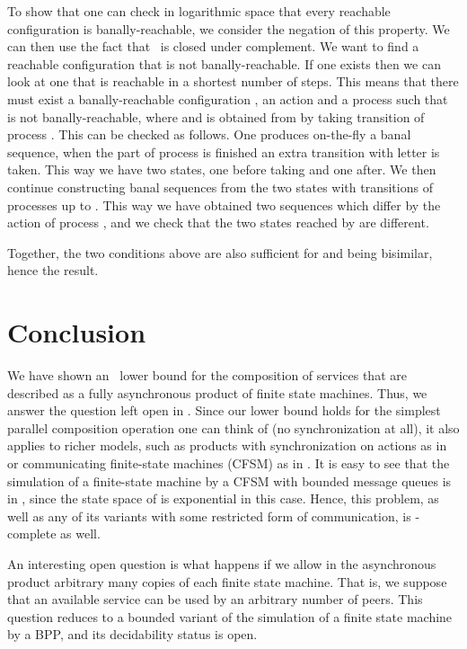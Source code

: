 \documentclass{LMCS}
\theoremstyle{plain}\newtheorem{remark}{Remark}
\theoremstyle{plain}\newtheorem{lemma}[thm]{Lemma}
\begin{document}
To show that one can check in logarithmic space that every reachable
configuration is banally-reachable, we consider
the negation of this property. We can then use the fact that
\LOGSPACE\ is closed under complement. We want to find a reachable
configuration that is not banally-reachable. If one exists then we can
look at one that is reachable in a shortest number of steps. This
means that there must exist a banally-reachable configuration
, an action  and a process  such that
 is not banally-reachable, where 
and  is obtained from  by taking transition  of
process . This can be checked as follows. One produces on-the-fly a
banal sequence, when the part of process  is finished an extra
transition with letter  is taken. This way we have two states, one
before taking  and one after. We then continue constructing banal
sequences from the two states with transitions of processes  up
to . This way we have obtained two sequences which differ by the
action  of process , and we check that the two states reached by
 are different.

Together, the two conditions above are also sufficient for  and
 being bisimilar, hence the result.



\section{Conclusion}

We have shown an \EXPTIME\ lower bound for the composition of
services that are described as a fully asynchronous product of finite state
machines. Thus, we answer the question left open in \cite{BCGLM03}. 
Since our lower bound holds for the simplest parallel composition
operation one can think of (no synchronization at all), it also
applies to richer models, such as products with synchronization on
actions as in \cite{LarSch00} or communicating finite-state machines
(CFSM) as in \cite{hbcs03,fbs04}. It is easy to see that the
simulation of a finite-state machine by a CFSM  with bounded
message queues is in \EXPTIME, since the state space of  is
exponential in this case. Hence, this problem, as well as any of its
variants with some restricted form of communication, is
\EXPTIME-complete as well.

An interesting open question  is what happens if we allow in the
asynchronous product arbitrary many copies of each finite state
machine. That is, we suppose that an available service can be used
by an arbitrary number of peers. This question reduces to a bounded
variant  of the simulation of a finite state machine by a BPP, and its
decidability status is open.
\end{document}
